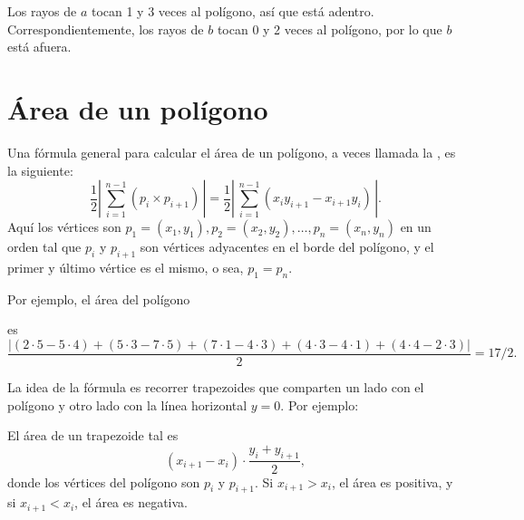 Los rayos de $a$ tocan 1 y 3 veces al polígono, así que está adentro.
Correspondientemente, los rayos de $b$ tocan 0 y 2 veces al polígono, por
lo que $b$ está afuera.

\section{Área de un polígono}


Una fórmula general para calcular el área de un polígono, a veces llamada la
, es la siguiente:
\[\frac{1}{2} \left|\,\sum_{i=1}^{n-1} \left(p_i \times p_{i+1}\right)\,\right| =
    \frac{1}{2} \left|\,\sum_{i=1}^{n-1} \left(x_i y_{i+1} - x_{i+1} y_i\right)\,\right|. \]
Aquí los vértices son $p_1=(x_1,y_1), p_2=(x_2,y_2), \ldots, p_n=(x_n,y_n)$
en un orden tal que $p_i$ y $p_{i+1}$ son vértices adyacentes en el borde del
polígono, y el primer y último vértice es el mismo, o sea, $p_1=p_n$.

Por ejemplo, el área del polígono
\begin{center}
\end{center}
es
\[\frac{\left|(2\cdot5-5\cdot4)+(5\cdot3-7\cdot5)+(7\cdot1-4\cdot3)+(4\cdot3-4\cdot1)+(4\cdot4-2\cdot3)\right|}{2} = 17/2.\]

La idea de la fórmula es recorrer trapezoides que comparten un lado con el
polígono y otro lado con la línea horizontal $y=0$. Por ejemplo:
\begin{center}
\end{center}
El área de un trapezoide tal es
\[\left(x_{i+1}-x_{i}\right) \cdot \frac{y_i+y_{i+1}}{2},\]
donde los vértices del polígono son $p_i$ y $p_{i+1}$. Si $x_{i+1}>x_{i}$,
el área es positiva, y si $x_{i+1}<x_{i}$, el área es negativa.

